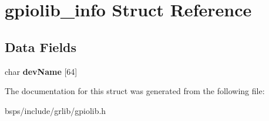 \hypertarget{structgpiolib__info}{}\section{gpiolib\+\_\+info Struct Reference}
\label{structgpiolib__info}
\subsection*{Data Fields}
\begin{DoxyCompactItemize}
\item 
\mbox{\label{structgpiolib__info_a17a1c230082532140df60d11c593cb49}} 
char {\bfseries dev\+Name} \mbox{[}64\mbox{]}
\end{DoxyCompactItemize}


The documentation for this struct was generated from the following file\+:\begin{DoxyCompactItemize}
\item 
bsps/include/grlib/gpiolib.\+h\end{DoxyCompactItemize}
